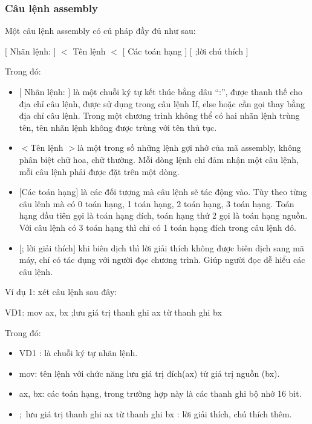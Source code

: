 		\subsubsection{Câu lệnh assembly}
		Một câu lệnh assembly có cú pháp đầy đủ như sau: 
		 \begin{center}		 
			\selectfont
		 	$[ $ Nhãn lệnh: $]$  	$<$ Tên lệnh $<$ 	$[$ Các toán hạng $]$	$[$ ;lời chú thích $]$ \\
		 \end{center}			
		Trong đó:
		
		\begin{itemize}
		\renewcommand{\labelitemi}{\textbullet}		
		\item $[$ Nhãn lệnh: $]$  là một chuỗi ký tự kết thúc bằng dâu “:”, được thanh thế cho địa chỉ câu lệnh, được sử dụng trong câu lệnh If, else hoặc cần gọi thay bằng địa chỉ câu lệnh. Trong một chương trình không thể có hai nhãn lệnh trùng tên, tên nhãn lệnh không được trùng với tên thủ tục.
		\item $<$Tên lệnh $>$là một trong số những lệnh gợi nhớ của mã assembly, không phân biệt chữ hoa, chữ thường. Mỗi dòng lệnh chỉ đảm nhận một câu lệnh, mỗi câu lệnh phải được đặt trên một dòng.
		\item $[$Các toán hạng$]$ là các đối tượng mà câu lệnh sẽ tác động vào. Tùy theo từng câu lênh mà có 0 toán hạng, 1 toán hạng, 2 toán hạng, 3 toán hạng. Toán hạng đầu tiên gọi là toán hạng đích, toán hạng thứ 2 gọi là toán hạng nguồn. Với câu lệnh có 3 toán hạng thì chỉ có 1 toán hạng đích trong câu lệnh đó. 
		\item $[$; lời giải thích$]$ khi biên dịch thì lời giải thích không được biên dịch sang mã máy, chỉ có tác dụng với người đọc chương trình. Giúp người đọc dễ hiểu các câu lệnh.
		\end{itemize}

	Ví dụ 1: xét câu lệnh sau đây: 
	 \begin{center}		 
		VD1: mov ax, bx	;lưu giá trị thanh ghi ax từ thanh ghi bx
	\end{center}
	Trong đó:
	\begin{itemize}
		\renewcommand{\labelitemi}{\textbullet}			
	  \item	VD1 : là chuỗi ký tự nhãn lệnh.
	\item	mov: tên lệnh với chức năng lưu giá trị đích(ax) từ giá trị nguồn (bx).
	\item	ax, bx: các toán hạng, trong trường hợp này là các thanh ghi bộ nhớ 16 bit.
	\item $;$ lưu giá trị thanh ghi ax từ thanh ghi bx : lời giải thích, chú thích thêm.
	\end{itemize}
	
